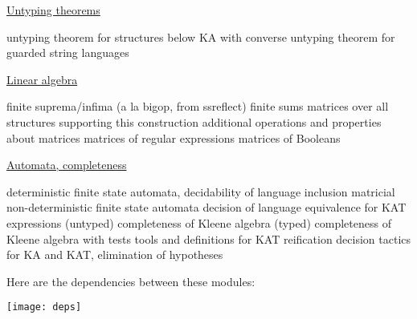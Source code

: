 \documentclass[a4paper]{llncs}
\begin{document}
\begin{description}
\begin{description}
  \end{description}
  \item {}\ul{Untyping theorems}
  \begin{description}
     untyping theorem for structures
    below KA with converse
     untyping theorem for guarded
    string languages
  \end{description}
  \item {}\ul{Linear algebra}
  \begin{description}
     finite suprema/infima (a la bigop, from ssreflect)
     finite sums
     matrices over all structures
    supporting this construction
     additional operations and
    properties about matrices
     matrices of regular expressions
     matrices of Booleans
  \end{description}
  \item {}\ul{Automata, completeness}
  \begin{description}
     deterministic finite state automata, decidability of language inclusion
     matricial non-deterministic finite state automata
     decision of language equivalence for KAT expressions
     (untyped) completeness of Kleene algebra 
     (typed) completeness of Kleene
    algebra with tests
     tools and definitions for KAT reification
     decision tactics for KA and KAT,
    elimination of hypotheses
  \end{description}
\end{description}


\clearpage

Here are the dependencies between these modules:

\bigskip
\noindent\hspace{-.1\linewidth}
\texttt{[image: deps]}
\end{document}

